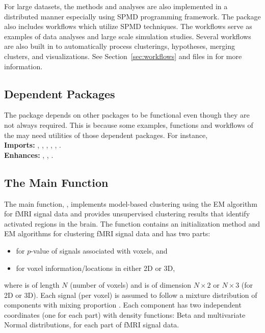 For large datasets, the methods and analyses are also implemented in a
distributed manner 
especially using SPMD programming framework.
The package also includes workflows which utilize SPMD techniques.
The workflows serve as examples of data analyses and
large scale simulation studies. Several workflows are also built in to
automatically process clusterings, hypotheses, merging clusters, and
visualizations. See Section~\ref{sec:workflows} and files in
 for more information.


\subsection[Dependent Packages]{Dependent Packages}

The  package depends on other  packages to be
functional even though they are not always required. This is because
some examples, functions and workflows of the 
 may need utilities of those dependent packages.
For instance,
\\
\hspace*{0.5cm}
{\bf Imports:} , , ,
, , .
\\
\hspace*{0.5cm}
{\bf Enhances:} , , .


\subsection[The Main Function]{The Main Function}

The main function, , implements model-based clustering
using the EM algorithm~\citep{McLachlan1996} for fMRI signal data and
provides unsupervised clustering results that identify activated regions
in the brain. The  function contains an initialization method and
EM algorithms for clustering fMRI signal data and has two parts:
\begin{itemize}
\item
{} for $p$-value of signals associated with voxels, and
\item
{} for voxel information/locations in either 2D or 3D,
\end{itemize}
where  is of length $N$ (number of voxels) and
 is of dimension $N \times 2$ or $N \times 3$ (for 2D or 3D).
Each signal (per voxel) is assumed to follow a mixture distribution
of  components with mixing proportion .
Each component has
two independent coordinates (one for each part)
with density functions: Beta and multivariate
Normal distributions, for each part of fMRI signal data.
\\

